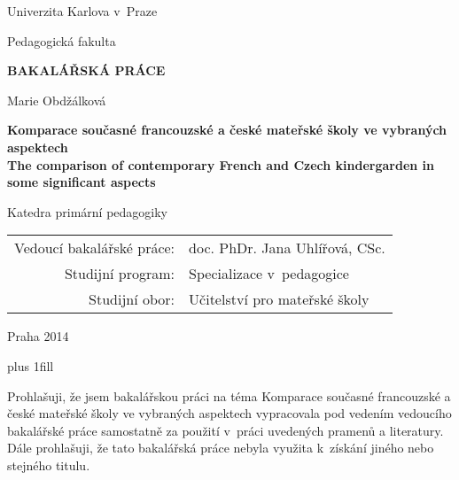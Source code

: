 \documentclass[12pt,a4paper,singleside,openright]{report}
\newcommand{\mujNazevPrace}{Komparace současné francouzské a české mateřské školy ve vybraných aspektech}
\newcommand{\mujNazevPraceAJ}{The comparison of contemporary French and Czech kindergarden in some significant aspects}
\newcommand{\mujVedouci}{doc. PhDr. Jana Uhlířová, CSc.}
\newcommand{\mujKatedra}{Katedra primární pedagogiky}
\newcommand{\mujProgram}{Specializace v~pedagogice}
\newcommand{\mujObor}{Učitelství pro mateřské školy}
\begin{document}


\pagestyle{empty}
\begin{center}

\large

Univerzita Karlova v~Praze

\medskip

Pedagogická fakulta

\vfill

{\bf\Large BAKALÁŘSKÁ PRÁCE}

\vfill


\vfill
\vspace{5mm}

{\LARGE Marie Obdžálková}

\vspace{15mm}

{\LARGE\bfseries
	\mujNazevPrace
\large\bfseries \\
\vspace{8mm}
	\mujNazevPraceAJ
}

\vfill

\mujKatedra

\vfill

\begin{tabular}{rl}

Vedoucí bakalářské práce: & \mujVedouci \\
\noalign{\vspace{2mm}}
Studijní program: & \mujProgram \\
\noalign{\vspace{2mm}}
Studijní obor: & \mujObor \\
\end{tabular}

\vfill

Praha 2014

\end{center}

\newpage

	\vglue 0pt plus 1fill

	\noindent
	Prohlašuji, že jsem bakalářskou práci na téma Komparace současné francouzské a české mateřské školy ve vybraných aspektech vypracovala pod vedením vedoucího bakalářské práce samostatně za použití v práci uvedených pramenů a literatury. Dále prohlašuji, že tato bakalářská práce nebyla využita k získání jiného nebo stejného titulu.
\end{document}
